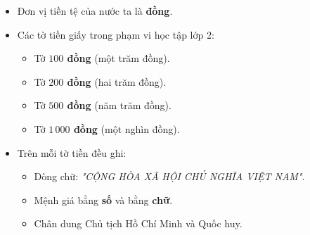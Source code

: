 \documentclass[10pt,a4paper]{article}
\begin{document}
\noindent
\begin{minipage}[t]{0.49\textwidth}\vspace{0pt}
\begin{tcolorbox}[
  enhanced,
  colback=violet!4!white,
  colframe=violet!75!black,
  arc=2mm, boxrule=0.8pt,
  left=2mm, right=2mm, top=1.8mm, bottom=1.8mm,
  title={\footnotesize\bfseries\color{white}\faKey\ 1. Nhận biết các mệnh giá tiền Việt Nam}
]
{\footnotesize
\begin{itemize}\setlength{\itemsep}{1pt}\setlength{\leftskip}{-2.5mm}
  \item Đơn vị tiền tệ của nước ta là \textbf{đồng}.
  \item Các tờ tiền giấy trong phạm vi học tập lớp 2:
  \begin{itemize}\setlength{\itemsep}{0.5pt}\setlength{\leftskip}{-2mm}
    \item Tờ \textbf{$100$ đồng} (một trăm đồng).
    \item Tờ \textbf{$200$ đồng} (hai trăm đồng).
    \item Tờ \textbf{$500$ đồng} (năm trăm đồng).
    \item Tờ \textbf{$1\,000$ đồng} (một nghìn đồng).
  \end{itemize}
  \item Trên mỗi tờ tiền đều ghi:
  \begin{itemize}\setlength{\itemsep}{0.5pt}\setlength{\leftskip}{-2mm}
    \item Dòng chữ: \textit{"CỘNG HÒA XÃ HỘI CHỦ NGHĨA VIỆT NAM"}.
    \item Mệnh giá bằng \textbf{số} và bằng \textbf{chữ}.
    \item Chân dung Chủ tịch Hồ Chí Minh và Quốc huy.
  \end{itemize}
\end{itemize}
}
\end{tcolorbox}
\end{minipage}
\hfill
\end{document}
